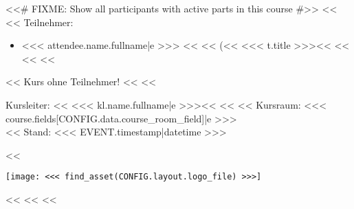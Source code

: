         <<# FIXME: Show all participants with active parts in this course #>>
        <<%
            <<%
                Teilnehmer:
                \begin{itemize}
                    <<%
                        \item <<< attendee.name.fullname|e >>>
                              <<%
                              <<%
                                (<<%
                                    <<< t.title >>><<%
                                 <<%
                              <<%
                    <<%
                \end{itemize}
            <<%
                Kurs ohne Teilnehmer!
            <<%
        <<%

        \vspace{\fill}
        \begin{minipage}[b]{\textwidth-2.5cm}%
            Kursleiter:
            <<%
                <<< kl.name.fullname|e >>><<%
            <<%
            <<%
                Kursraum: <<< course.fields[CONFIG.data.course_room_field]|e >>>\\
            <<%
            Stand: <<< EVENT.timestamp|datetime >>>
        \end{minipage}%
        \hspace{0.5cm}%
        <<%
            \begin{minipage}[b][2cm][b]{2cm}%
                \texttt{[image: <<< find\_asset(CONFIG.layout.logo\_file) >>>]}
            \end{minipage}%
        <<%
        \pagebreak
    <<%
<<%
